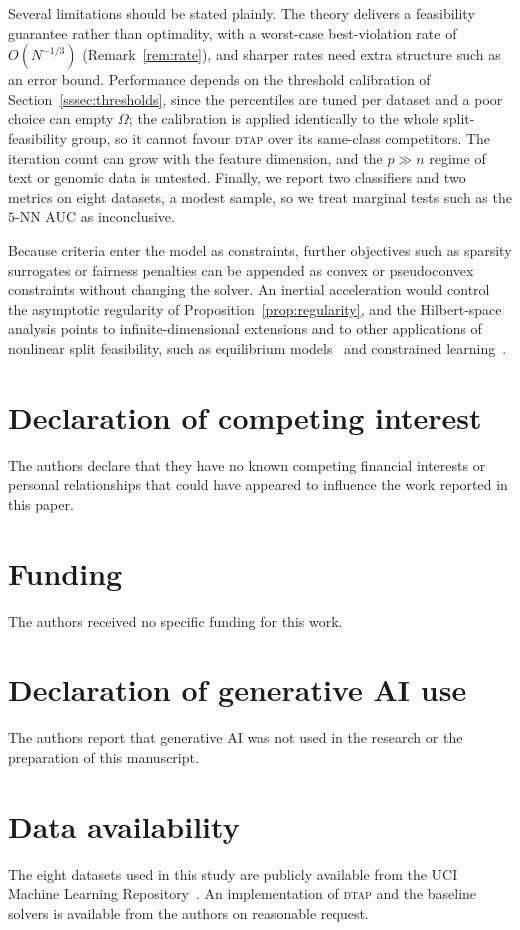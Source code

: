 \documentclass[]{interact}
\theoremstyle{plain}
\theoremstyle{definition}
\theoremstyle{remark}
\newcommand{\dtap}{\textsc{dtap}}
\begin{document}
Several limitations should be stated plainly. The theory delivers a feasibility guarantee rather than optimality, with a worst-case best-violation rate of $O(N^{-1/3})$ (Remark~\ref{rem:rate}), and sharper rates need extra structure such as an error bound. Performance depends on the threshold calibration of Section~\ref{sssec:thresholds}, since the percentiles are tuned per dataset and a poor choice can empty $\Omega$; the calibration is applied identically to the whole split-feasibility group, so it cannot favour \dtap{} over its same-class competitors. The iteration count can grow with the feature dimension, and the $p\gg n$ regime of text or genomic data is untested. Finally, we report two classifiers and two metrics on eight datasets, a modest sample, so we treat marginal tests such as the $5$-NN AUC as inconclusive.

Because criteria enter the model as constraints, further objectives such as sparsity surrogates or fairness penalties can be appended as convex or pseudoconvex constraints without changing the solver. An inertial acceleration would control the asymptotic regularity of Proposition~\ref{prop:regularity}, and the Hilbert-space analysis points to infinite-dimensional extensions and to other applications of nonlinear split feasibility, such as equilibrium models~\citep{yen2019} and constrained learning~\citep{tuan2024}.

\section*{Declaration of competing interest}
The authors declare that they have no known competing financial interests or
personal relationships that could have appeared to influence the work reported
in this paper.

\section*{Funding}
The authors received no specific funding for this work.

\section*{Declaration of generative AI use}
The authors report that generative AI was not used in the research or the
preparation of this manuscript.

\section*{Data availability}
The eight datasets used in this study are publicly available from the UCI Machine
Learning Repository~\citep{kelly2023uci}. An implementation of \dtap{} and the
baseline solvers is available from the authors on reasonable request.
\end{document}
